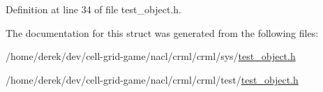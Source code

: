 Definition at line 34 of file test\_\-object.h.



The documentation for this struct was generated from the following files:\begin{DoxyCompactItemize}
\item 
/home/derek/dev/cell-\/grid-\/game/nacl/crml/crml/sys/\hyperlink{sys_2test__object_8h}{test\_\-object.h}\item 
/home/derek/dev/cell-\/grid-\/game/nacl/crml/crml/test/\hyperlink{test_2test__object_8h}{test\_\-object.h}\end{DoxyCompactItemize}
